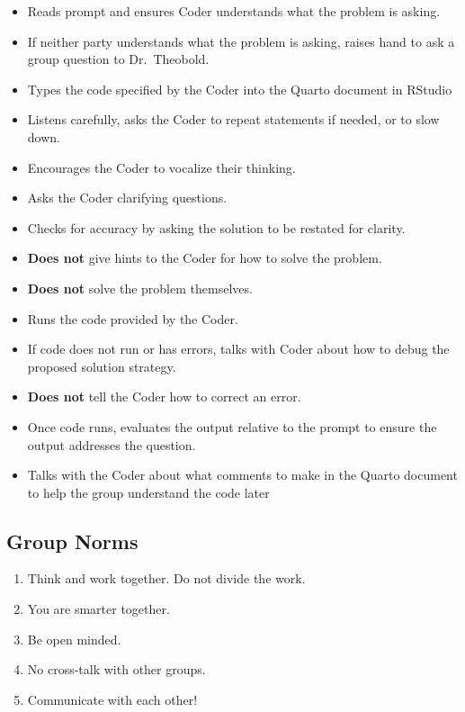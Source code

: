 \documentclass[
  letterpaper,
  DIV=11,
  numbers=noendperiod]{scrartcl}
\providecommand{\tightlist}{%
  \setlength{\itemsep}{0pt}\setlength{\parskip}{0pt}}\usepackage{longtable,booktabs,array}
\begin{document}
\begin{itemize}
\tightlist
\item
  Reads prompt and ensures Coder understands what the problem is asking.
\item
  If neither party understands what the problem is asking, raises hand
  to ask a group question to Dr.~Theobold.
\item
  Types the code specified by the Coder into the Quarto document in
  RStudio
\item
  Listens carefully, asks the Coder to repeat statements if needed, or
  to slow down.
\item
  Encourages the Coder to vocalize their thinking.
\item
  Asks the Coder clarifying questions.
\item
  Checks for accuracy by asking the solution to be restated for clarity.
\item
  \textbf{Does not} give hints to the Coder for how to solve the
  problem.
\item
  \textbf{Does not} solve the problem themselves.
\item
  Runs the code provided by the Coder.
\item
  If code does not run or has errors, talks with Coder about how to
  debug the proposed solution strategy.
\item
  \textbf{Does not} tell the Coder how to correct an error.
\item
  Once code runs, evaluates the output relative to the prompt to ensure
  the output addresses the question.
\item
  Talks with the Coder about what comments to make in the Quarto
  document to help the group understand the code later
\end{itemize}

\subsection{Group Norms}\label{group-norms}

\begin{enumerate}
\def\labelenumi{\arabic{enumi}.}
\tightlist
\item
  Think and work together. Do not divide the work.
\item
  You are smarter together.
\item
  Be open minded.
\item
  No cross-talk with other groups.
\item
  Communicate with each other!
\end{enumerate}
\end{document}
